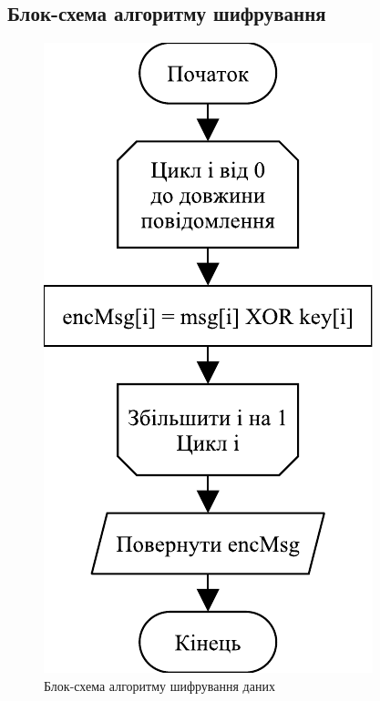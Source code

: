 \documentclass[a4paper,oneside,titlepage,14pt]{extarticle}
\begin{document}
\begin{appendices}
		\section{Блок-схема алгоритму шифрування}
			\vspace*{\fill}
			\begin{figure}[h]
				\centering
				\includegraphics[scale=1]{diagrams/enciphering-algorithm-flowchart.pdf}
				\caption{Блок-схема алгоритму шифрування даних}
				\label{fig:encipheringflowchart}
			\end{figure}
			\vspace*{\fill}
			\newpage

\end{appendices}
\end{document}
